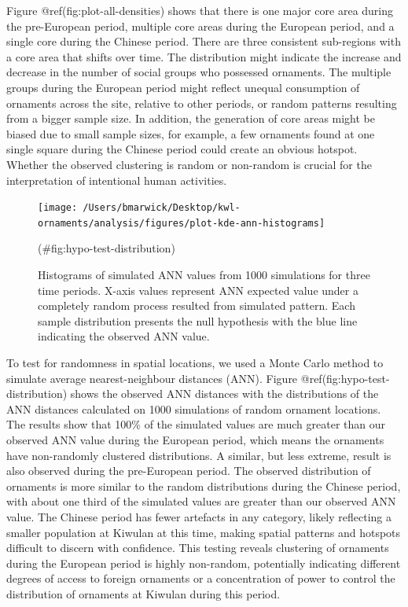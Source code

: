 \documentclass[]{article}
\begin{document}
Figure @ref(fig:plot-all-densities) shows that there is one major core
area during the pre-European period, multiple core areas during the
European period, and a single core during the Chinese period. There are
three consistent sub-regions with a core area that shifts over time. The
distribution might indicate the increase and decrease in the number of
social groups who possessed ornaments. The multiple groups during the
European period might reflect unequal consumption of ornaments across
the site, relative to other periods, or random patterns resulting from a
bigger sample size. In addition, the generation of core areas might be
biased due to small sample sizes, for example, a few ornaments found at
one single square during the Chinese period could create an obvious
hotspot. Whether the observed clustering is random or non-random is
crucial for the interpretation of intentional human activities.

\begin{figure}
\texttt{[image: /Users/bmarwick/Desktop/kwl-ornaments/analysis/figures/plot-kde-ann-histograms]} \caption{Histograms of simulated ANN values from 1000 simulations for three time periods. X-axis values represent ANN expected value under a completely random process resulted from simulated pattern. Each sample distribution presents the null hypothesis with the blue line indicating the observed ANN value.}(\#fig:hypo-test-distribution)
\end{figure}

To test for randomness in spatial locations, we used a Monte Carlo
method to simulate average nearest-neighbour distances (ANN). Figure
@ref(fig:hypo-test-distribution) shows the observed ANN distances with
the distributions of the ANN distances calculated on 1000 simulations of
random ornament locations. The results show that 100\% of the simulated
values are much greater than our observed ANN value during the European
period, which means the ornaments have non-randomly clustered
distributions. A similar, but less extreme, result is also observed
during the pre-European period. The observed distribution of ornaments
is more similar to the random distributions during the Chinese period,
with about one third of the simulated values are greater than our
observed ANN value. The Chinese period has fewer artefacts in any
category, likely reflecting a smaller population at Kiwulan at this
time, making spatial patterns and hotspots difficult to discern with
confidence. This testing reveals clustering of ornaments during the
European period is highly non-random, potentially indicating different
degrees of access to foreign ornaments or a concentration of power to
control the distribution of ornaments at Kiwulan during this period.
\end{document}

